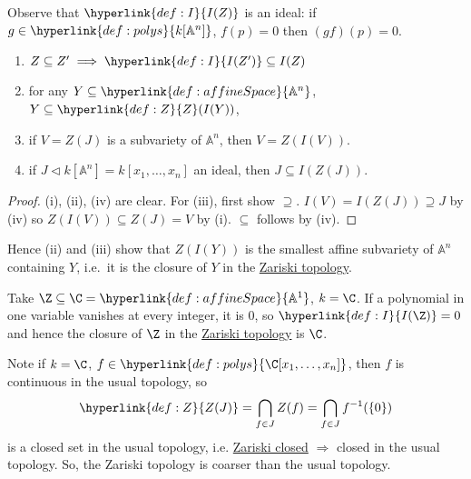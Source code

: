 \documentclass{article}
\newcommand{\A}{\mathbb{A}}
\begin{document}
Observe that $\hyperlink{def:I}{I(Z)}$ is an ideal: if $g \in \hyperlink{def:polys}{k[\A^n]}$, $f(p) = 0$ then $(gf)(p) = 0$.
\begin{lemma}
    \leavevmode
    \begin{enumerate}[label=(\roman*)]
        \item $Z \subseteq Z' \implies \hyperlink{def:I}{I(Z')} \subseteq I(Z)$
        \item for any $Y \subseteq \hyperlink{def:affineSpace}{\A^n}$, $Y \subseteq \hyperlink{def:Z}{Z}(I(Y))$,
        \item if $V = Z(J)$ is a subvariety of $\A^n$, then $V = Z(I(V))$.
        \item if $J \lhd k[\A^n] = k[x_1, \dotsc, x_n]$ an ideal, then $J \subseteq I(Z(J))$.
    \end{enumerate}
\end{lemma}
\begin{proof}
    (i), (ii), (iv) are clear.
    For (iii), first show $\supseteq$. $I(V) = I(Z(J))\supseteq J$ by (iv) so $Z(I(V)) \subseteq Z(J)=V$ by (i). $\subseteq$ follows by (iv).
\end{proof}
Hence (ii) and (iii) show that $Z(I(Y))$ is the smallest affine subvariety of $\A^n$ containing $Y$, i.e.\ it is the closure of $Y$ in the \hyperlink{def:zariski}{Zariski topology}.

\begin{eg}
    Take $\Z \subseteq \C = \hyperlink{def:affineSpace}{\A^1}$, $k = \C$.
    If a polynomial in one variable vanishes at every integer, it is $0$, so $\hyperlink{def:I}{I(\Z)} = 0$ and hence the closure of $\Z$ in the \hyperlink{def:zariski}{Zariski topology} is $\C$.
\end{eg}

Note if $k = \C$, $f \in \hyperlink{def:polys}{\C[x_1, \dotsc, x_n]}$, then $f$ is continuous in the usual topology, so
\begin{equation*}
    \hyperlink{def:Z}{Z(J)} = \bigcap_{f \in J} Z(f) = \bigcap_{f \in J} f^{-1}(\{0\})
\end{equation*}
is a closed set in the usual topology, i.e. \hyperlink{def:zariski}{Zariski closed} $\Rightarrow$ closed in the usual topology.
So, the Zariski topology is coarser than the usual topology.
\end{document}
